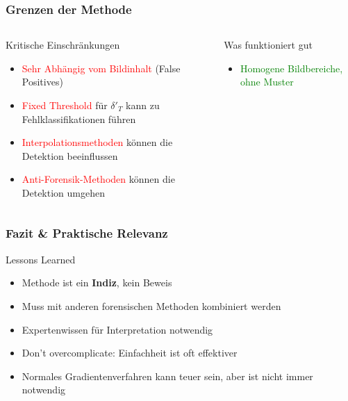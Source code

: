 \documentclass[11pt,t,usepdftitle=false,aspectratio=169]{beamer}
\begin{document}
\begin{frame}
	\frametitle{Grenzen der Methode}
	
	\begin{columns}[T]
		\begin{column}{0.48\textwidth}
			\begin{alertblock}{Kritische Einschränkungen}
				\begin{itemize}
					\item \textcolor{red}{Sehr Abhängig vom Bildinhalt} (False Positives)
					\item \textcolor{red}{Fixed Threshold} für $\delta'_T$ kann zu Fehlklassifikationen führen
					\item \textcolor{red}{Interpolationsmethoden} können die Detektion beeinflussen
					\item \textcolor{red}{Anti-Forensik-Methoden} können die Detektion umgehen~\cite{kirchner_hiding_2008}
				\end{itemize}
			\end{alertblock}
		\end{column}
		\begin{column}{0.48\textwidth}
			\begin{exampleblock}{Was funktioniert gut}
				\begin{itemize}
					\item \textcolor{green}{Homogene Bildbereiche, ohne Muster}
				\end{itemize}
			\end{exampleblock}
		\end{column}
	\end{columns}
	
	\vspace{1em}
	
\end{frame}

\begin{frame}
	\frametitle{Fazit \& Praktische Relevanz}
	
    \begin{block}{Lessons Learned}
        \begin{itemize}
            \item Methode ist ein \textbf{Indiz}, kein Beweis
            \item Muss mit anderen forensischen Methoden kombiniert werden
            \item Expertenwissen für Interpretation notwendig
            \item Don't overcomplicate: Einfachheit ist oft effektiver
            \item Normales Gradientenverfahren kann teuer sein, aber ist nicht immer notwendig
        \end{itemize}
    \end{block}
\end{frame}
\end{document}
